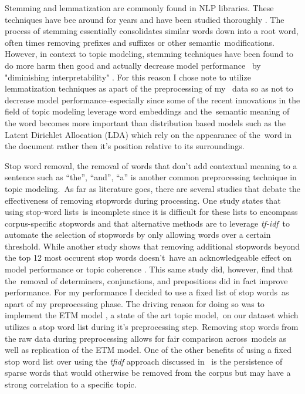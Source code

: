 \documentclass[letterpaper,12pt]{article}
\begin{document}
Stemming and lemmatization are commonly found in NLP libraries. These techniques have bee around for years and have been studied thoroughly \cite{lovins1968development, kanis2010comparison, jivani2011comparative, larkey2002improving}.
The process of stemming essentially consolidates similar words down into a root word, often times removing prefixes and suffixes or other semantic\
modifications. However, in context to topic modeling, stemming techniques have been found to do more harm then good and actually decrease model performance \cite{schofieldunderstanding} \
by "diminishing interpretability" \cite{boyd2014care}. For this reason I chose note to utilize lemmatization techniques as apart of the preprocessing of my \
data so as not to decrease model performance--especially since some of the recent innovations in the field of topic modeling leverage word embeddings \cite{mikolov2013distributed} and the\
semantic meaning of the word becomes more important than distribution based models such as the Latent Dirichlet Allocation (LDA) \cite{blei2003latent} which rely on the appearance of the\
word in the document rather then it's position relative to its surroundings.

Stop word removal, the removal of words that don't add contextual meaning to a sentence such as ``the'', ``and'', ``a'' is another common preprocessing technique in topic modeling.\
As far as literature goes, there are several studies that debate the effectiveness of removing stopwords during processing. One study states that using stop-word lists\
is incomplete since it is difficult for these lists to encompass corpus-specific stopwords \cite{boyd2014care} and that alternative methods are to leverage \emph{tf-idf}\cite{Salton1968AutomaticIO}\
to automate the selection of stopwords by only allowing words over a certain threshold. While another study shows that removing additional stopwords beyond the top 12 most occurent stop words doesn't\
have an acknowledgeable effect on model performance or topic coherence \cite{schofieldunderstanding}. This same study did, however, find that the\
removal of determiners, conjunctions, and prepositions did in fact improve performance. For my performance I decided to use a fixed list of stop words\
as apart of my preprocessing phase. The driving reason for doing so was to implement the ETM model \cite{dieng2019topic}, a state of the art topic model,\
on our dataset which utilizes a stop word list during it's preprocessing step. Removing stop words from the raw data during preprocessing allows for fair comparison across\
models as well as replication of the ETM model. One of the other benefits of using a fixed stop word list over using the \emph{tfidf} approach discussed in \cite{boyd2014care}\
is the persistence of sparse words that would otherwise be removed from the corpus but may have a strong correlation to a specific topic.
\end{document}

